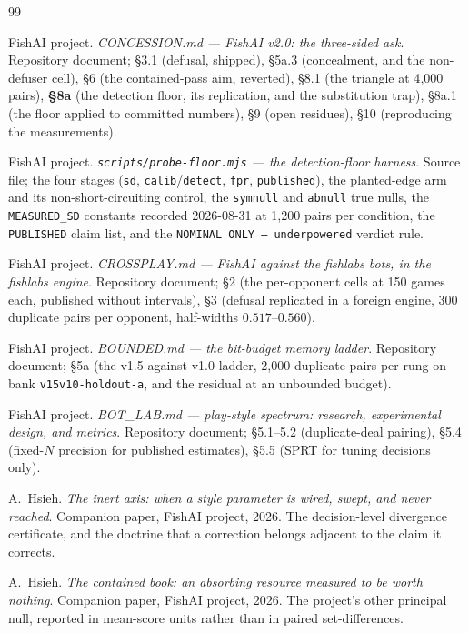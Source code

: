\documentclass[11pt]{article}
\newcommand{\code}[1]{\texttt{#1}}
\begin{document}
\begin{thebibliography}{99}
\small

FishAI project.
\emph{CONCESSION.md --- FishAI v2.0: the three-sided ask}.
Repository document; \S3.1 (defusal, shipped), \S5a.3 (concealment, and the non-defuser cell), \S6
(the contained-pass aim, reverted), \S8.1 (the triangle at 4{,}000 pairs), \textbf{\S8a} (the
detection floor, its replication, and the substitution trap), \S8a.1 (the floor applied to committed
numbers), \S9 (open residues), \S10 (reproducing the measurements).

FishAI project.
\emph{\code{scripts/probe-floor.mjs} --- the detection-floor harness}.
Source file; the four stages (\code{sd}, \code{calib}/\code{detect}, \code{fpr},
\code{published}), the planted-edge arm and its non-short-circuiting control, the \code{symnull}
and \code{abnull} true nulls, the \code{MEASURED\_SD} constants recorded 2026-08-31 at 1{,}200
pairs per condition, the \code{PUBLISHED} claim list, and the \code{NOMINAL ONLY --- underpowered}
verdict rule.

FishAI project.
\emph{CROSSPLAY.md --- FishAI against the fishlabs bots, in the fishlabs engine}.
Repository document; \S2 (the per-opponent cells at 150 games each, published without intervals),
\S3 (defusal replicated in a foreign engine, 300 duplicate pairs per opponent, half-widths
$0.517$--$0.560$).

FishAI project.
\emph{BOUNDED.md --- the bit-budget memory ladder}.
Repository document; \S5a (the v1.5-against-v1.0 ladder, 2{,}000 duplicate pairs per rung on bank
\code{v15v10-holdout-a}, and the residual at an unbounded budget).

FishAI project.
\emph{BOT\_LAB.md --- play-style spectrum: research, experimental design, and metrics}.
Repository document; \S5.1--5.2 (duplicate-deal pairing), \S5.4 (fixed-$N$ precision for published
estimates), \S5.5 (SPRT for tuning decisions only).

A.~Hsieh.
\emph{The inert axis: when a style parameter is wired, swept, and never reached}.
Companion paper, FishAI project, 2026. The decision-level divergence certificate, and the doctrine
that a correction belongs adjacent to the claim it corrects.

A.~Hsieh.
\emph{The contained book: an absorbing resource measured to be worth nothing}.
Companion paper, FishAI project, 2026. The project's other principal null, reported in mean-score
units rather than in paired set-differences.


\end{thebibliography}
\end{document}
